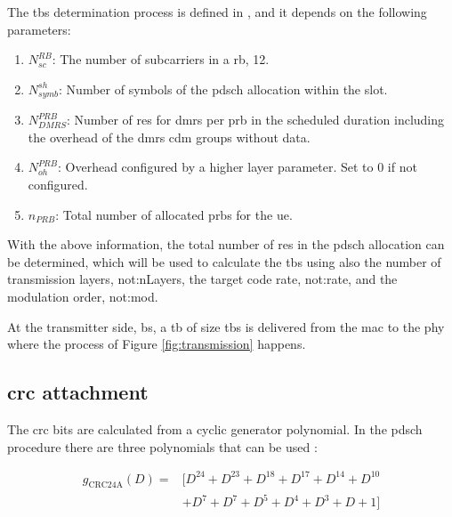 The \gls{tbs} determination process is defined in \cite[Section 5.1.3.2]{3gpp.38.214}, and it depends on the following parameters:

\begin{enumerate}
    \item $N_{sc}^{RB}$: The number of subcarriers in a \gls{rb}, 12.
    \item $N_{symb}^{sh}$: Number of symbols of the \gls{pdsch} allocation within the slot.
    \item $N_{DMRS}^{PRB}$: Number of \glspl{re} for \gls{dmrs} per \gls{prb} in the scheduled duration including the overhead of the \gls{dmrs} \gls{cdm} groups without data.
    \item $N_{oh}^{PRB}$: Overhead configured by a higher layer parameter. Set to 0 if not configured.
    \item $n_{PRB}$: Total number of allocated \glspl{prb} for the \gls{ue}.
\end{enumerate}

With the above information, the total number of \glspl{re} in the \gls{pdsch} allocation can be determined, which will be used to calculate the \gls{tbs} using also the number of transmission layers, \gls{not:nLayers}, the target code rate, \gls{not:rate}, and the modulation order, \gls{not:mod}.

At the transmitter side, \gls{bs}, a \gls{tb} of size \gls{tbs} is delivered from the \gls{mac} to the \gls{phy} where the process of Figure \ref{fig:transmission} happens.


\subsection{\gls{crc} attachment}

The \gls{crc} bits are calculated from a cyclic generator polynomial.
%
In the \gls{pdsch} procedure there are three polynomials that can be used \cite{3gpp.38.212}:

\begin{equation} \label{eq.:crc24a}
    \begin{split}
        g_{\mathrm{CRC24A}}(D) = & [ D^{24} + D^{23} + D^{18} + D^{17} +  D^{14} + D^{10} \\ & + D^{7} + D^{7} + D^{5} + D^{4} + D^{3} + D + 1 ]
    \end{split}
\end{equation}

